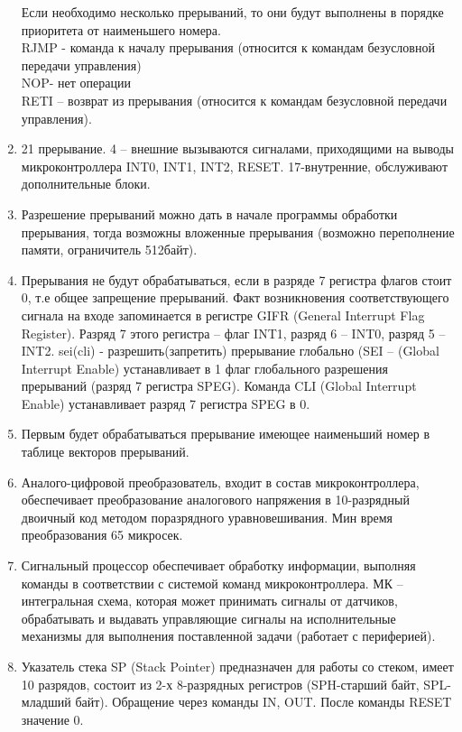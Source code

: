 \documentclass{article}
\begin{document}
\begin{enumerate}
Если необходимо несколько прерываний, то они будут выполнены в порядке приоритета от наименьшего номера. \\
RJMP - команда к началу прерывания (относится к командам безусловной передачи управления) \\
NOP- нет операции \\
RETI – возврат из прерывания (относится к командам безусловной передачи управления).	
		\begin{figure}[h!]
		\end{figure}
\newpage
		\item 21 прерывание. 4 – внешние вызываются сигналами, приходящими на выводы микроконтроллера INT0, INT1, INT2, RESET. 17-внутренние, обслуживают дополнительные блоки.
		\item Разрешение прерываний можно дать в начале программы обработки прерывания, тогда возможны вложенные прерывания (возможно переполнение памяти, ограничитель 512байт).
		\item Прерывания не будут обрабатываться, если в разряде 7 регистра флагов стоит 0, т.е общее запрещение прерываний. Факт возникновения соответствующего сигнала на входе запоминается в регистре GIFR (General Interrupt Flag Register). Разряд 7 этого регистра – флаг INT1, разряд 6 – INT0, разряд 5 – INT2.   
sei(cli) - разрешить(запретить) прерывание глобально  (SEI – (Global Interrupt Enable) устанавливает в 1 флаг глобального разрешения прерываний (разряд 7 регистра SPEG). Команда CLI (Global Interrupt Enable) устанавливает разряд 7 регистра SPEG в 0. 
		\item Первым будет обрабатываться прерывание имеющее наименьший номер в таблице векторов прерываний.
		\item Аналого-цифровой преобразователь, входит в состав микроконтроллера, обеспечивает преобразование аналогового напряжения в 10-разрядный двоичный код методом поразрядного уравновешивания. Мин время преобразования 65 микросек. 
		\item Сигнальный процессор обеспечивает обработку информации, выполняя команды в соответствии с системой команд микроконтроллера. 
МК – интегральная схема, которая может принимать сигналы от датчиков, обрабатывать и выдавать управляющие сигналы на исполнительные механизмы для выполнения поставленной задачи (работает с периферией). 
		\item Указатель стека SP (Stack Pointer) предназначен для работы со стеком, имеет 10 разрядов, состоит из 2-х 8-разрядных регистров (SPH-старший байт, SPL-младший байт). Обращение через команды IN, OUT. После команды RESET значение 0. 

\end{enumerate}
\end{document}
